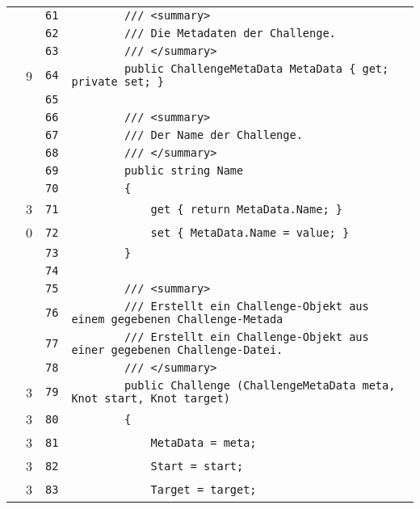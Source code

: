 \documentclass[a4paper,10pt]{article}
\begin{document}
\begin{longtable}[l]{lrrl}
\cellcolor{gray} &  & \verb~61~ & \verb~        /// <summary>~\\
\cellcolor{gray} &  & \verb~62~ & \verb~        /// Die Metadaten der Challenge.~\\
\cellcolor{gray} &  & \verb~63~ & \verb~        /// </summary>~\\
\cellcolor{green} & 9 & \verb~64~ & \verb~        public ChallengeMetaData MetaData { get; private set; }~\\
\cellcolor{gray} &  & \verb~65~ & \verb~~\\
\cellcolor{gray} &  & \verb~66~ & \verb~        /// <summary>~\\
\cellcolor{gray} &  & \verb~67~ & \verb~        /// Der Name der Challenge.~\\
\cellcolor{gray} &  & \verb~68~ & \verb~        /// </summary>~\\
\cellcolor{gray} &  & \verb~69~ & \verb~        public string Name~\\
\cellcolor{gray} &  & \verb~70~ & \verb~        {~\\
\cellcolor{green} & 3 & \verb~71~ & \verb~            get { return MetaData.Name; }~\\
\cellcolor{red} & 0 & \verb~72~ & \verb~            set { MetaData.Name = value; }~\\
\cellcolor{gray} &  & \verb~73~ & \verb~        }~\\
\cellcolor{gray} &  & \verb~74~ & \verb~~\\
\cellcolor{gray} &  & \verb~75~ & \verb~        /// <summary>~\\
\cellcolor{gray} &  & \verb~76~ & \verb~        /// Erstellt ein Challenge-Objekt aus einem gegebenen Challenge-Metada~\\
\cellcolor{gray} &  & \verb~77~ & \verb~        /// Erstellt ein Challenge-Objekt aus einer gegebenen Challenge-Datei.~\\
\cellcolor{gray} &  & \verb~78~ & \verb~        /// </summary>~\\
\cellcolor{green} & 3 & \verb~79~ & \verb~        public Challenge (ChallengeMetaData meta, Knot start, Knot target)~\\
\cellcolor{green} & 3 & \verb~80~ & \verb~        {~\\
\cellcolor{green} & 3 & \verb~81~ & \verb~            MetaData = meta;~\\
\cellcolor{green} & 3 & \verb~82~ & \verb~            Start = start;~\\
\cellcolor{green} & 3 & \verb~83~ & \verb~            Target = target;~\\

\end{longtable}
\end{document}

